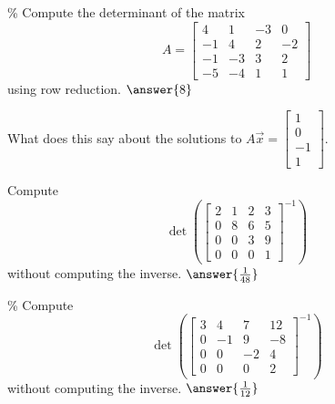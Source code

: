 \documentclass{ximera}
\begin{document}
\begin{exercise}\%
    Compute the determinant of the matrix
    \[ A = \begin{bmatrix}
        4  & 1 & -3 &  0\\
        -1 &  4 &  2 & -2\\
        -1 & -3 & 3 & 2\\
        -5 & -4 & 1 & 1
    \end{bmatrix}
    \]
    using row reduction.  $\answer{8}$
    \begin{problem}
        What does this say about the solutions to $A\vec{x} = \left[ \begin{smallmatrix} 1 \\ 0 \\ -1 \\ 1 \end{smallmatrix} \right]$.
        \begin{multipleChoice}
        \end{multipleChoice}
    \end{problem}
\end{exercise}

\begin{exercise}
    Compute
    \begin{equation*}
    \det \left( \begin{bmatrix}
        2 & 1 & 2 & 3 \\
        0 & 8 & 6 & 5 \\
        0 & 0 & 3 & 9 \\
        0 & 0 & 0 & 1
    \end{bmatrix}^{-1}
    \right)
    \end{equation*}
    without computing the inverse. $\answer{\frac{1}{48}}$
\end{exercise}

\begin{exercise}\%
    Compute
    \begin{equation*}
    \det \left( \begin{bmatrix}
        3 & 4 & 7 & 12 \\
        0 & -1 & 9 & -8 \\
        0 & 0 & -2 & 4 \\
        0 & 0 & 0 & 2
    \end{bmatrix}^{-1}
    \right)
    \end{equation*}
    without computing the inverse. $\answer{\frac{1}{12}}$
\end{exercise}
\end{document}
